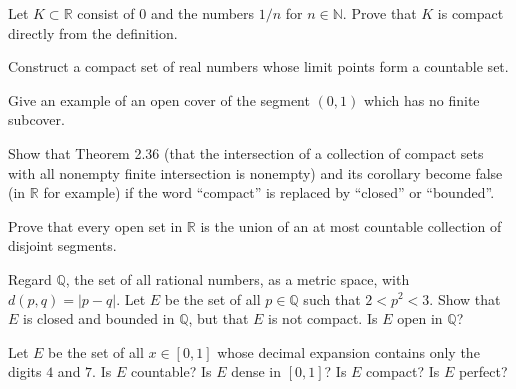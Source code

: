 \documentclass[12 pt, letterpaper]{hmcpset}
\begin{document}
\pagebreak

\begin{problem}[12.]
	Let $K \subset \mathbb{R}$ consist of $0$ and the numbers $1/n$ for $n \in \mathbb{N}$. Prove that $K$ is compact directly from the definition.
\end{problem}

\pagebreak

\begin{problem}[13.]
	Construct a compact set of real numbers whose limit points form a countable set.
\end{problem}

\pagebreak

\begin{problem}[14.]
	Give an example of an open cover of the segment $(0, 1)$ which has no finite subcover.
\end{problem}

\pagebreak

\begin{problem}[15.]
	Show that Theorem 2.36 (that the intersection of a collection of compact sets with all nonempty finite intersection is nonempty) and its corollary become false (in $\mathbb{R}$ for example) if the word ``compact'' is replaced by ``closed'' or ``bounded''.
\end{problem}

\pagebreak

\begin{problem}[15*.]
	Prove that every open set in $\mathbb{R}$ is the union of an at most countable collection of disjoint segments.
\end{problem}

\pagebreak

\begin{problem}[16.]
	Regard $\mathbb{Q}$, the set of all rational numbers, as a metric space, with $d(p, q) = \lvert p - q \rvert$. Let $E$ be the set of all $p \in \mathbb{Q}$ such that $2 < p^{2} < 3$. Show that $E$ is closed and bounded in $\mathbb{Q}$, but that $E$ is not compact. Is $E$ open in $\mathbb{Q}$?
\end{problem}

\pagebreak

\begin{problem}[17.]
	Let $E$ be the set of all $x \in [0, 1]$ whose decimal expansion contains only the digits $4$ and $7$. Is $E$ countable? Is $E$ dense in $[0, 1]$? Is $E$ compact? Is $E$ perfect?
\end{problem}
\end{document}
